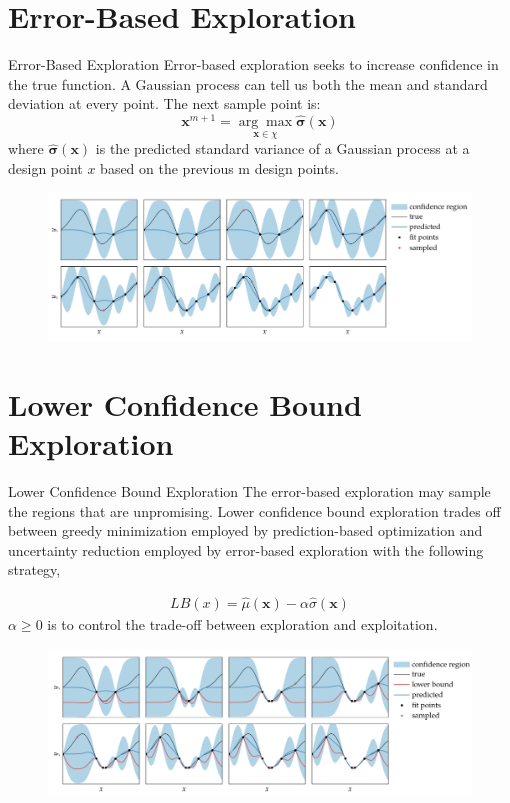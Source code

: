 \documentclass{beamer}
\begin{document}
\section{Error-Based Exploration}
\begin{frame}{Error-Based Exploration}
Error-based exploration seeks to increase confidence in the true function. A Gaussian process can tell us both the mean and standard deviation at every point. The next sample point is:
\begin{equation*}
    \boldsymbol{x}^{m+1} = \underset{\boldsymbol{x}\in \chi}{\arg\max} \hat{\boldsymbol{\sigma}}(\boldsymbol{x})
\end{equation*}
where $\hat{\boldsymbol{\sigma}}(\boldsymbol{x})$ is the predicted standard variance of a Gaussian process at a design point $x$ based on the previous m design points. 

\begin{figure}
\centering
\includegraphics[width=120mm]{Figs/error-explore.jpeg}
\end{figure} 
\end{frame}


\section{Lower Confidence Bound Exploration}
\begin{frame}{Lower Confidence Bound Exploration}
The error-based exploration may sample the regions that are unpromising. Lower confidence bound exploration trades off between greedy minimization employed by prediction-based optimization and uncertainty reduction employed by error-based exploration with the following strategy,

\begin{gather*}
    LB(x) = \hat{\mu}(\boldsymbol{x})-\alpha \hat{\sigma}(\boldsymbol{x})
\end{gather*}
$\alpha \geq 0$ is to control the trade-off between exploration and exploitation. 
\begin{figure}
\centering
\includegraphics[width=120mm]{Figs/LB.jpeg}
\end{figure} 

\end{frame}
\end{document}
